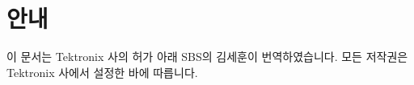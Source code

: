 \documentclass[10pt,twocolumn,a4paper]{book}
\begin{document}
\null

\thispagestyle{empty}

\tableofcontents

\section{안내}
이 문서는 Tektronix 사의 허가 아래 SBS의 김세훈이 번역하였습니다. 모든 저작권은 Tektronix 사에서 설정한 바에 따릅니다.

\twocolumn





















\printindex
\end{document}
